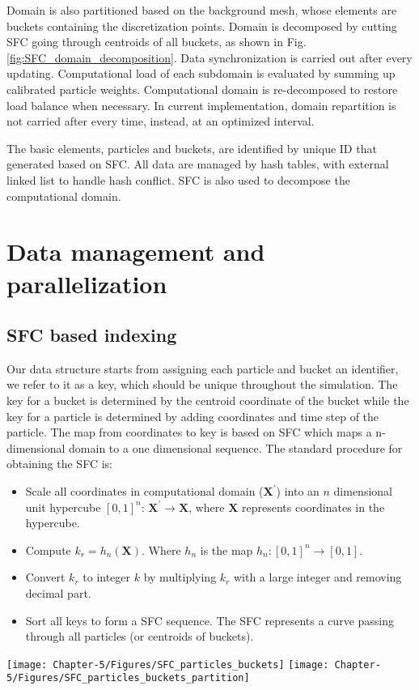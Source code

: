 Domain is also partitioned based on the background mesh, whose elements are buckets containing the discretization points. Domain is decomposed by cutting SFC going through centroids of all buckets, as shown in Fig. \ref{fig:SFC_domain_decomposition}.
Data synchronization is carried out after every updating. Computational load of each subdomain is evaluated by summing up calibrated particle weights. Computational domain is re-decomposed to restore load balance when necessary.
In current implementation, domain repartition is not carried after every time, instead, at an optimized interval.

The basic elements, particles and buckets, are identified by unique ID that generated based on SFC. All data are managed by hash tables, with external linked list to handle hash conflict. SFC is also used to decompose the computational domain.


\section{Data management and parallelization}
\subsection{SFC based indexing}
Our data structure starts from assigning each particle and bucket an identifier, we refer to it as a key, which should be unique throughout the simulation. The key for a bucket is determined by the centroid coordinate of the bucket while the key for a particle is determined by adding coordinates and time step of the particle. The map from coordinates to key is based on SFC \citep{sagan2012space} which maps a n-dimensional domain to a one dimensional sequence. The standard procedure for obtaining the SFC is: 
\begin{itemize}
\item Scale all coordinates in computational domain ($\textbf{X}^\prime$) into an $n$ dimensional unit hypercube $[0,1]^n $: $\textbf{X}^\prime \rightarrow \textbf{X}$, where $\textbf{X}$ represents coordinates in the hypercube.
\item Compute $k_r = h_n(\textbf{X})$. Where $h_n$ is the map $h_n: [0,1]^n \rightarrow [0,1]$. 
\item Convert $k_r$ to integer $k$ by multiplying $k_r$ with a large integer and removing decimal part.
\item Sort all keys to form a SFC sequence. The SFC represents a curve passing through all particles (or centroids of buckets).
\end{itemize}
%
\begin{figure*}[!t]
\centering
\texttt{[image: Chapter-5/Figures/SFC\_particles\_buckets]}
\hfil
\texttt{[image: Chapter-5/Figures/SFC\_particles\_buckets\_partition]}
\caption{The left figure shows SFCs passing all particles and buckets. The right figure shows an example of a domain decomposition based on the SFC of buckets.}
\label{fig:SFC_domain_decomposition}
\end{figure*}

